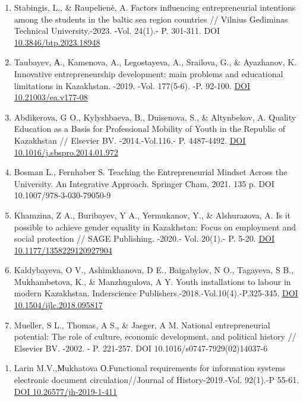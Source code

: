 \begin{references}
\begin{enumerate}
\def\labelenumi{\arabic{enumi}.}
\setcounter{enumi}{3}
\item
  Stabingis, L., \& Raupelienė, A. Factors influencing entrepreneurial
  intentions among the students in the baltic sea region countries //
  Vilnius Gediminas Technical University.-2023. -Vol. 24(1).- P.
  301-311. DOI
  \href{https://doi.org/10.3846/btp.2023.18948}{10.3846/btp.2023.18948}
\item
  Taubayev, А., Kamenova, A., Legostayeva, A., Srailova, G., \&
  Ayazhanov, K. Innovative entrepreneurship development: main problems
  and educational limitations in Kazakhstan. -2019. -Vol. 177(5-6). -P.
  92-100. \href{https://doi.org/10.21003/ea.v177-08}{DOI
  10.21003/ea.v177-08}
\item
  Abdikerova, G O., Kylyshbaeva, B., Duisenova, S., \& Altynbekov, A.
  Quality Education as a Basis for Professional Mobility of Youth in the
  Republic of Kazakhstan // Elsevier BV. -2014.-Vol.116.- P. 4487-4492.
  \href{https://doi.org/10.1016/j.sbspro.2014.01.972}{DOI
  10.1016/j.sbspro.2014.01.972}
\item
  Bosman L., Fernhaber S. Teaching the Entrepreneurial Mindset Across
  the University. An Integrative Approach. Springer Cham, 2021. 135 p.
  DOI 10.1007/978-3-030-79050-9
\item
  Khamzina, Z A., Buribayev, Y A., Yermukanov, Y., \& Alshurazova, A. Is
  it possible to achieve gender equality in Kazakhstan: Focus on
  employment and social protection // SAGE Publishing. -2020.- Vol.
  20(1).- P. 5-20. \href{https://doi.org/10.1177/1358229120927904}{DOI
  10.1177/1358229120927904}
\item
  Kaldybayeva, O V., Ashimkhanova, D E., Baigabylov, N O., Tagayeva, S
  B., Mukhambetova, K., \& Manzhugulova, A Y. Youth installations to
  labour in modern Kazakhstan. Inderscience
  Publishers.-2018.-Vol.10(4).-P.325-345.
  \href{https://doi.org/10.1504/ijlc.2018.095817}{DOI
  10.1504/ijlc.2018.095817}
\item
  Mueller, S L., Thomas, A S., \& Jaeger, A M. National entrepreneurial
  potential: The role of culture, economic development, and political
  history // Elsevier BV. -2002. - P. 221-257.
  DOI 10.1016/s0747-7929(02)14037-6
\end{enumerate}


\begin{enumerate}
\def\labelenumi{\arabic{enumi}.}
\setcounter{enumi}{10}
\item
  Larin M.V.,Мukhatova О.Functional requirements for information systems
  electronic document circulation//Journal of History-2019.-Vol.
  92(1).-P 55-61. \href{https://doi.org/10.26577/jh-2019-1-411}{DOI
  10.26577/jh-2019-1-411}
\end{enumerate}
\end{references}
